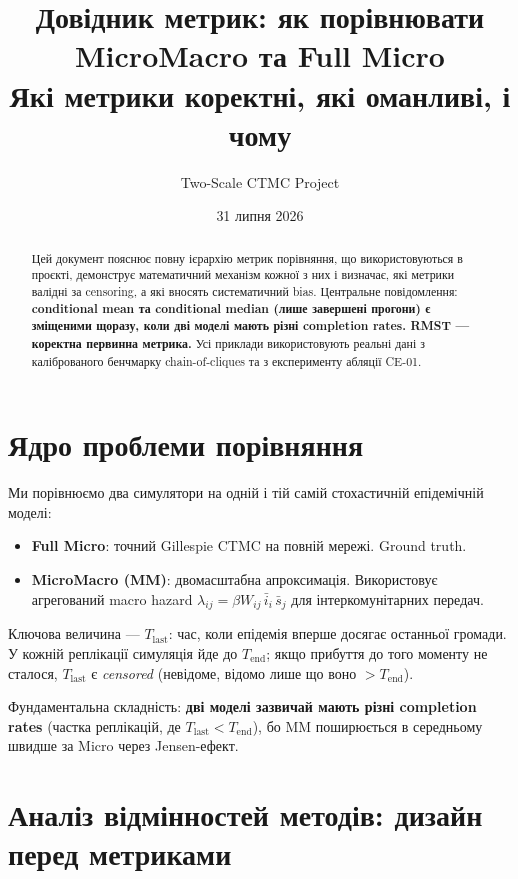\documentclass[11pt,a4paper]{article}
\title{\textbf{Довідник метрик: як порівнювати MicroMacro та Full Micro}\\[0.5em]
\large Які метрики коректні, які оманливі, і чому}
\author{Two-Scale CTMC Project}
\date{31 липня 2026}
\begin{document}
\maketitle

\begin{abstract}
Цей документ пояснює повну ієрархію метрик порівняння, що використовуються в
проєкті, демонструє математичний механізм кожної з них і визначає,
які метрики валідні за censoring, а які вносять систематичний bias.
Центральне повідомлення: \textbf{conditional mean та conditional median (лише
завершені прогони) є зміщеними щоразу, коли дві моделі мають різні completion
rates. RMST --- коректна первинна метрика.}
Усі приклади використовують реальні дані з каліброваного бенчмарку chain-of-cliques
та з експерименту абляції CE-01.
\end{abstract}

\tableofcontents
\clearpage

\section{Ядро проблеми порівняння}

Ми порівнюємо два симулятори на одній і тій самій стохастичній епідемічній моделі:
\begin{itemize}
  \item \textbf{Full Micro}: точний Gillespie CTMC на повній мережі.
        Ground truth.
  \item \textbf{MicroMacro (MM)}: двомасштабна апроксимація.
        Використовує агрегований macro hazard $\lambda_{ij} = \beta W_{ij}\,\bar{i}_i\,\bar{s}_j$
        для інтеркомунітарних передач.
\end{itemize}

Ключова величина --- $T_{\mathrm{last}}$: час, коли епідемія вперше
досягає останньої громади.  У кожній реплікації симуляція йде до
$T_{\mathrm{end}}$; якщо прибуття до того моменту не сталося, $T_{\mathrm{last}}$
є \emph{censored} (невідоме, відомо лише що воно $> T_{\mathrm{end}}$).

Фундаментальна складність: \textbf{дві моделі зазвичай мають різні
completion rates} (частка реплікацій, де $T_{\mathrm{last}} <
T_{\mathrm{end}}$), бо MM поширюється в середньому швидше за Micro через
Jensen-ефект.

\section{Аналіз відмінностей методів: дизайн перед метриками}
\label{sec:methodology}
\end{document}
